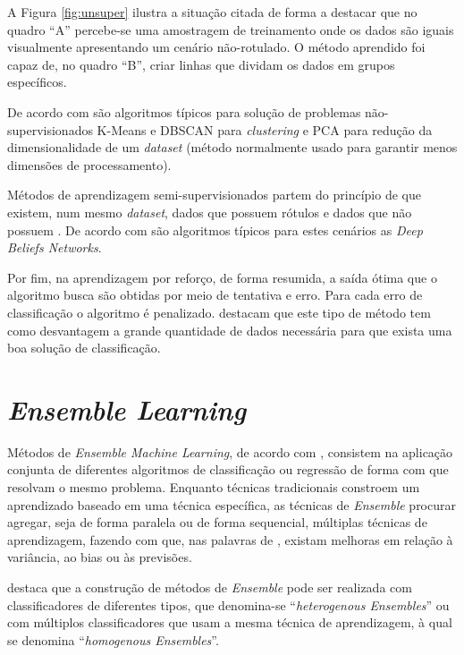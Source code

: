  A Figura \ref{fig:unsuper} ilustra a situação citada de forma a destacar que no quadro ``A'' percebe-se uma amostragem de treinamento onde os dados são iguais visualmente apresentando um cenário não-rotulado. O método aprendido foi capaz de, no quadro ``B'', criar linhas que dividam os dados em grupos específicos. 

De acordo com  são algoritmos típicos para solução de problemas não-supervisionados K-Means e DBSCAN para \textit{clustering} e PCA para redução da dimensionalidade de um \textit{dataset} (método normalmente usado para garantir menos dimensões de processamento).

Métodos de aprendizagem semi-supervisionados partem do princípio de que existem, num mesmo \textit{dataset}, dados que possuem rótulos e dados que não possuem \cite{li2018semi}. De acordo com  são algoritmos típicos para estes cenários as \textit{Deep Beliefs Networks}.

Por fim, na aprendizagem por reforço, de forma resumida, a saída ótima que o algoritmo busca são obtidas por meio de tentativa e erro. Para cada erro de classificação o algoritmo é penalizado.  destacam que este tipo de método tem como desvantagem a grande quantidade de dados necessária para que exista uma boa solução de classificação.

\section{\textit{Ensemble Learning}}
\label{Ensemble}
Métodos de \textit{Ensemble Machine Learning}, de acordo com , consistem na aplicação conjunta de diferentes algoritmos de classificação ou regressão de forma com que resolvam o mesmo problema. Enquanto técnicas tradicionais constroem um aprendizado baseado em uma técnica específica, as técnicas de \textit{Ensemble} procurar agregar, seja de forma paralela ou de forma sequencial, múltiplas técnicas de aprendizagem, fazendo com que, nas palavras de , existam melhoras em relação à variância, ao bias ou às previsões. 

 destaca que a construção de métodos de \textit{Ensemble} pode ser realizada com classificadores de diferentes tipos, que denomina-se ``\textit{heterogenous Ensembles}'' ou com múltiplos classificadores que usam a mesma técnica de aprendizagem, à qual se denomina ``\textit{homogenous Ensembles}''.



